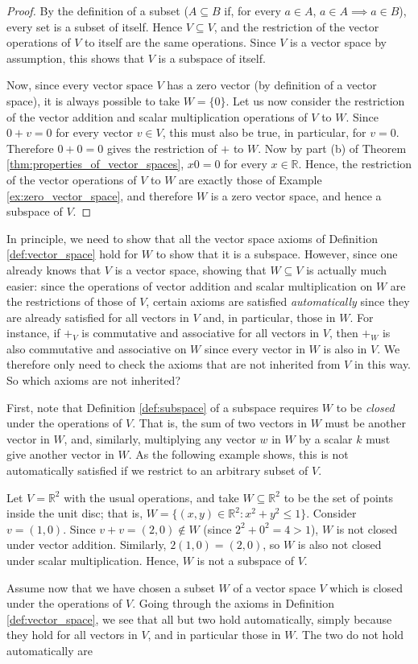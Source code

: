\documentclass[12pt,letterpaper,reqno]{article}
\numberwithin{equation}{section}
\newcommand{\R}{\ensuremath{\mathbb R}}
\begin{document}
\begin{proof}
	By the definition of a subset ($A \subseteq B$ if, for every $a \in A$, $a \in A \implies a \in B$), every set is a subset of itself. Hence $V \subseteq V$, and the restriction of the vector operations of $V$ to itself are the same operations. Since $V$ is a vector space by assumption, this shows that $V$ is a subspace of itself.
	
	Now, since every vector space $V$ has a zero vector (by definition of a vector space), it is always possible to take  $W=\{0\}$. Let us now consider the restriction of the vector addition and scalar multiplication operations of $V$ to $W$. Since $0+v=0$ for every vector $v \in V$, this must also be true, in particular, for $v=0$. Therefore $0+0=0$ gives the restriction of $+$ to $W$. Now by part (b) of Theorem \ref{thm:properties_of_vector_spaces}, $x0=0$ for every $x \in \mathbb{R}$. Hence, the restriction of the vector operations of $V$ to $W$ are exactly those of Example \ref{ex:zero_vector_space}, and therefore $W$ is a zero vector space, and hence a subspace of $V$.
\end{proof}

In principle, we need to show that all the vector space axioms of Definition \ref{def:vector_space} hold for $W$ to show that it is a subspace. However, since one already knows that $V$ is a vector space, showing that $W \subseteq V$ is actually much easier: since the operations of vector addition and scalar multiplication on $W$ are the restrictions of those of $V$, certain axioms are satisfied \emph{automatically} since they are already satisfied for all vectors in $V$ and, in particular, those in $W$. For instance, if $+_V$ is commutative and associative for all vectors in $V$, then $+_W$ is also commutative and associative on $W$ since every vector in $W$ is also in $V$. We therefore only need to check the axioms that are not inherited from $V$ in this way. So which axioms are not inherited? 

First, note that Definition \ref{def:subspace} of a subspace requires $W$ to be \emph{closed} under the operations of $V$. That is, the sum of two vectors in $W$ must be another vector in $W$, and, similarly, multiplying any vector $w$ in $W$ by a scalar $k$ must give another vector in $W$. As the following example shows, this is not automatically satisfied if we restrict to an arbitrary subset of $V$.

\begin{example}
Let $V=\mathbb{R}^2$ with the usual operations, and take $W \subseteq \R^2$ to be the set of points inside the unit disc; that is, $W=\{(x,y) \in \mathbb{R}^2:x^2+y^2 \leq 1 \}$. Consider $v=(1,0)$. Since $v+v=(2,0) \notin W$ (since $2^2+0^2=4>1$), $W$ is not closed under vector addition. Similarly, $2(1,0)=(2,0)$, so $W$ is also not closed under scalar multiplication. Hence, $W$ is not a subspace of $V$.	
\end{example}
Assume now that we have chosen a subset $W$ of a vector space $V$ which is closed under the operations of $V$. Going through the axioms in Definition \ref{def:vector_space}, we see that all but two hold automatically, simply because they hold for all vectors in $V$, and in particular those in $W$. The two do not hold automatically are 
\end{document}

